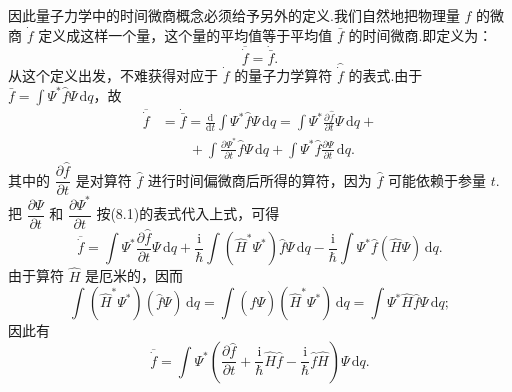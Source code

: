 因此量子力学中的时间微商概念必须给予另外的定义.我们自然地把物理量 $f$ 的微商 $\dot{f}$ 定义成这样一个量，这个量的平均值等于平均值 $\bar{f}$ 的时间微商.即定义为：
\begin{equation}
  \overline{\dot{f}}=\dot{\bar{f}}.
\end{equation}
从这个定义出发，不难获得对应于 $\dot{f}$ 的量子力学算符 $\hat{\dot{f}}$ 的表式.由于 $\bar{f}=\int\varPsi^{*}\hat{f}\varPsi\,\mathrm{d}q$，故
\begin{equation*}
\begin{aligned}
  \overline{\dot{f}}&=\dot{\bar{f}}
  =\frac{\mathrm{d}}{\mathrm{d}t}\int\varPsi^{*}\hat{f}\varPsi\,\mathrm{d}q
  =\int\varPsi^{*}\frac{\partial\hat{f}}{\partial t}\varPsi\,\mathrm{d}q+\\
  &\qquad+\int\frac{\partial\varPsi^{*}}{\partial t}\hat{f}\varPsi\,\mathrm{d}q
  +\int\varPsi^{*}\hat{f}\frac{\partial\varPsi}{\partial t}\,\mathrm{d}q.
\end{aligned}
\end{equation*}
其中的 $\dfrac{\partial\hat{f}}{\partial t}$ 是对算符 $\hat{f}$ 进行时间偏微商后所得的算符，因为 $\hat{f}$ 可能依赖于参量 $t$.把 $\dfrac{\partial\varPsi}{\partial t}$ 和 $\dfrac{\partial\varPsi^{*}}{\partial t}$ 按(8.1)的表式代入上式，可得
\begin{equation*}
  \overline{\dot{f}}=\int\varPsi^{*}\frac{\partial\hat{f}}{\partial t}\varPsi\,\mathrm{d}q
  +\frac{\mathrm{i}}{\hbar}\int(\hat{H}^{*}\varPsi^{*})\hat{f}\varPsi\,\mathrm{d}q
  -\frac{\mathrm{i}}{\hbar}\int\varPsi^{*}\hat{f}(\hat{H}\varPsi)\,\mathrm{d}q.
\end{equation*}
由于算符 $\hat{H}$ 是厄米的，因而
\begin{equation*}
  \int(\hat{H}^{*}\varPsi^{*})(\hat{f}\varPsi)\,\mathrm{d}q
  =\int(\hat{f}\varPsi)(\hat{H}^{*}\varPsi^{*})\,\mathrm{d}q
  =\int\varPsi^{*}\hat{H}\hat{f}\varPsi\,\mathrm{d}q;
\end{equation*}
因此有
\begin{equation*}
  \overline{\dot{f}}=\int\varPsi^{*}\left(\frac{\partial\hat{f}}{\partial t}
  +\frac{\mathrm{i}}{\hbar}\hat{H}\hat{f}
  -\frac{\mathrm{i}}{\hbar}\hat{f}\hat{H}\right)\varPsi\,\mathrm{d}q.
\end{equation*}
